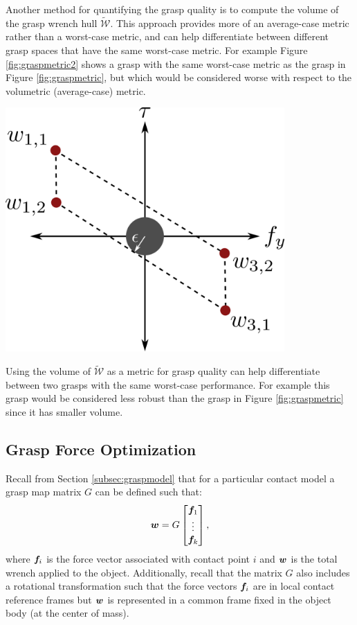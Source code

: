 Another method for quantifying the grasp quality is to compute the volume of the grasp wrench hull $\tilde{\mathcal{W}}$. This approach provides more of an average-case metric rather than a worst-case metric, and can help differentiate between different grasp spaces that have the same worst-case metric. For example Figure \ref{fig:graspmetric2} shows a grasp with the same worst-case metric as the grasp in Figure \ref{fig:graspmetric}, but which would be considered worse with respect to the volumetric (average-case) metric.
\begin{marginfigure} 
\begin{center}
\includegraphics[width=0.8\textwidth]{tex/figs/ch26_figs/2Dexample_d.png}
\caption{Using the volume of $\tilde{\mathcal{W}}$ as a metric for grasp quality can help differentiate between two grasps with the same worst-case performance. For example this grasp would be considered less robust than the grasp in Figure \ref{fig:graspmetric} since it has smaller volume.}
\label{fig:graspmetric2}
\end{center}
\end{marginfigure}

\subsection{Grasp Force Optimization}
Recall from Section \ref{subsec:graspmodel} that for a particular contact model a grasp map matrix $G$ can be defined such that:
\begin{equation} \label{eq:f2w}
    \bm{w} = G\begin{bmatrix} 
    \bm{f}_1 \\ \vdots \\ \bm{f}_k
    \end{bmatrix},
\end{equation}
where $\bm{f}_i$ is the force vector associated with contact point $i$ and $\bm{w}$ is the total wrench applied to the object. Additionally, recall that the matrix $G$ also includes a rotational transformation such that the force vectors $\bm{f}_i$ are in local contact reference frames but $\bm{w}$ is represented in a common frame fixed in the object body (at the center of mass).


